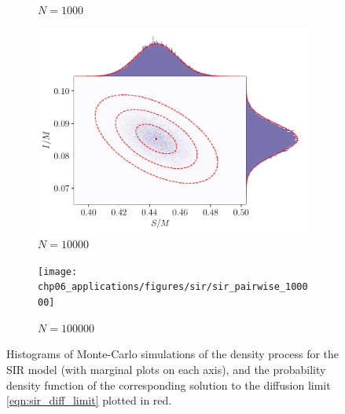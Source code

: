 \begin{figure}
\begin{center}
\begin{subfigure}{0.49\textwidth}
			\caption{\(N = 1000\)}
		\end{subfigure}
		\begin{subfigure}{0.49\textwidth}
			\includegraphics[width=\textwidth]{chp06_applications/figures/sir/sir_pairwise_10000}
			\caption{\(N = 10000\)}
		\end{subfigure}\begin{subfigure}{0.49\textwidth}
			\texttt{[image: chp06\_applications/figures/sir/sir\_pairwise\_100000]}
			\caption{\(N = 100000\)}
		\end{subfigure}
		\caption{Histograms of Monte-Carlo simulations of the density process for the SIR model (with marginal plots on each axis), and the probability density function of the corresponding solution to the diffusion limit \cref{eqn:sir_diff_limit} plotted in red.}
		\label{fig:}
	\end{center}
\end{figure}
